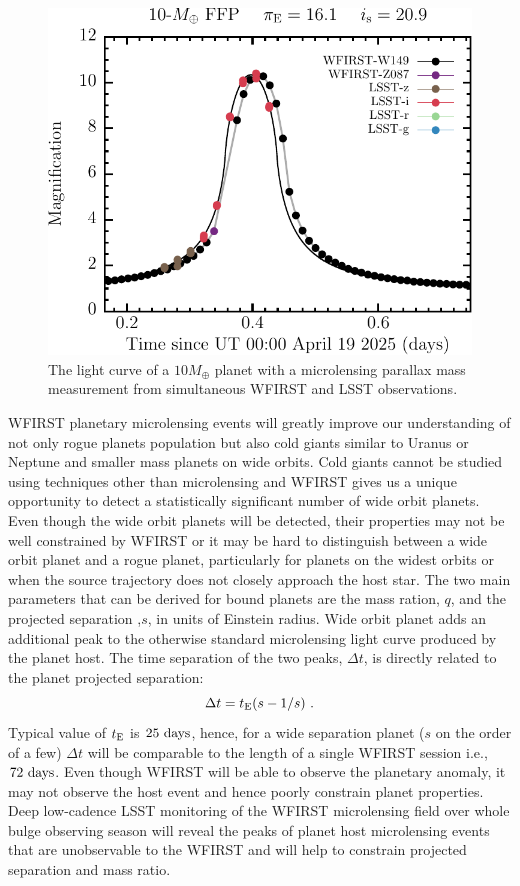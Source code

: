 \begin{figure}[t]
\centering\includegraphics[width=0.5\linewidth]{figs/WFIRST/lsst_lsstm+10_0_7220351_320_det_lc.pdf}
\caption{The light curve of a $10 M_{\oplus}$ planet with a microlensing parallax
mass measurement from simultaneous WFIRST and LSST observations.
\label{fig-lc}}
\end{figure}

WFIRST planetary microlensing events will greatly improve our
understanding of not only rogue planets population but also cold giants similar to
Uranus or Neptune and smaller mass planets on wide orbits. Cold giants
cannot be studied using techniques other than microlensing and
WFIRST gives us a unique opportunity to detect a statistically significant
number of wide orbit planets. Even though the wide orbit planets will be detected,
their properties may not be well constrained by WFIRST or it may be hard to distinguish
between a wide orbit planet and a rogue planet, particularly for planets on the widest
orbits or when the source trajectory does not closely approach the host star.
The two main parameters that can be derived for bound planets are
the mass ration, $q$, and the projected separation ,$s$, in units of Einstein radius.
Wide orbit planet adds an additional peak to the otherwise
standard microlensing light curve produced by the planet host.
The time separation of the two peaks, $\Delta t$, is directly related
to the planet projected separation:
\begin{equation}
 \Delta t =  t_{\rm E}(s - {1/s}) \ .
\end{equation}
Typical value of $t_{\rm E}$ is $25~{\rm days}$, hence, for a wide
separation planet ($s$ on the order of a few) $\Delta t$ will be
comparable to the length of a single WFIRST session i.e., $72~{\rm days}$.
Even though WFIRST will be able to observe the planetary anomaly,
it may not observe the host event and hence poorly constrain planet properties. Deep low-cadence LSST
monitoring of the WFIRST microlensing field over whole bulge observing season
will reveal the peaks of planet host microlensing events that are unobservable
to the WFIRST and will help to constrain projected separation and mass ratio.


